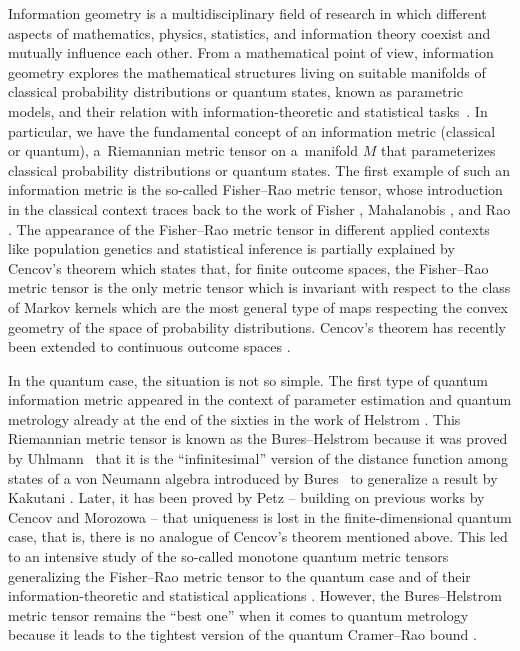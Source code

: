 \documentclass[10pt,a4paper]{amsart}
\numberwithin{equation}{section}
\begin{document}
Information geometry is a multidisciplinary field of research in which different aspects of mathematics, physics, statistics, and information theory coexist and mutually influence each other.
From a mathematical point of view, information geometry explores the mathematical structures living on suitable manifolds of classical probability distributions or quantum states, known as parametric models, and their relation with information-theoretic and statistical tasks~\cite{Amari-2016,A-N-2000}.
In particular, we have the fundamental concept of an information metric (classical or quantum), a~Riemannian metric tensor on a~manifold $M$ that parameterizes classical probability distributions or quantum states.
The first example of such an information metric is the so-called Fisher--Rao metric tensor, whose introduction in the classical context traces back to the work of Fisher \cite{Fisher-1922}, Mahalanobis \cite{Mahalanobis-1936}, and Rao \cite{Rao-1945}.
The appearance of the Fisher--Rao metric tensor in different applied contexts like population genetics and statistical inference is partially explained by Cencov's theorem \cite{Cencov-1982} which states that, for finite outcome spaces, the Fisher--Rao metric tensor is the only metric tensor which is invariant with respect to the class of Markov kernels which are the most general type of maps respecting the convex geometry of the space of probability distributions.
Cencov's theorem has recently been extended to continuous outcome spaces \cite{A-J-L-S-2015,A-J-L-S-2017,B-B-M-2016,Fujiwara-2023}.


In the quantum case, the situation is not so simple. The first type of quantum information metric appeared in the context of parameter estimation and quantum metrology already at the end of the sixties in the work of Helstrom \cite{Helstrom-1967, Helstrom-1968, Helstrom-1969}.
This Riemannian metric tensor is known as the Bures--Helstrom because it was proved by Uhlmann~\cite{Uhlmann-1976,Uhlmann-1992} that it is the ``infinitesimal'' version of the distance function among states of a von Neumann algebra introduced by Bures~\cite{Bures-1969} to generalize a result by Kakutani \cite{Kakutani-1948}.
Later, it has been proved by Petz \cite{Petz-1996} -- building on previous works by Cencov and Morozowa \cite{C-M-1991} -- that uniqueness is lost in the finite-dimensional quantum case, that is, there is no analogue of Cencov's theorem mentioned above.
This led to an intensive study of the so-called monotone quantum metric tensors generalizing the Fisher--Rao metric tensor to the quantum case \cite{C-DC-L-M-M-V-V-2018,F-K-M-M-S-V-2010,Hasegawa-1995,H-P-1997,L-R-1999,M-M-V-V-2017} and of their information-theoretic and statistical applications \cite{L-Y-L-W-2020,Paris-2009,S-Y-H-2020,T-A-2014,Wootters-1981}.
However, the Bures--Helstrom metric tensor remains the ``best one'' when it comes to quantum metrology because it leads to the tightest version of the quantum Cramer--Rao bound \cite{Fuchs-1996,Paris-2009}.
\end{document}
